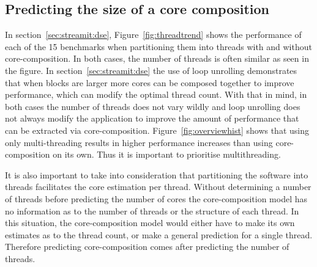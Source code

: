 \subsection{Predicting the size of a core composition}
In section~\ref{sec:streamit:dse}, Figure~\ref{fig:threadtrend} shows the performance of each of the 15 benchmarks when partitioning them into threads with and without core-composition.
In both cases, the number of threads is often similar as seen in the figure.
In section~\ref{sec:streamit:dse} the use of loop unrolling demonstrates that when blocks are larger more cores can be composed together to improve performance, which can modify the optimal thread count.
With that in mind, in both cases the number of threads does not vary wildly and loop unrolling does not always modify the application to improve the amount of performance that can be extracted via core-composition.
Figure~\ref{fig:overviewhist} shows that using only multi-threading results in higher performance increases than using core-composition on its own.
Thus it is important to prioritise multithreading.

It is also important to take into consideration that partitioning the software into threads facilitates the core estimation per thread.
Without determining a number of threads before predicting the number of cores the core-composition model has no information as to the number of threads or the structure of each thread.
In this situation, the core-composition model would either have to make its own estimates as to the thread count, or make a general prediction for a single thread.
Therefore predicting core-composition comes after predicting the number of threads.




